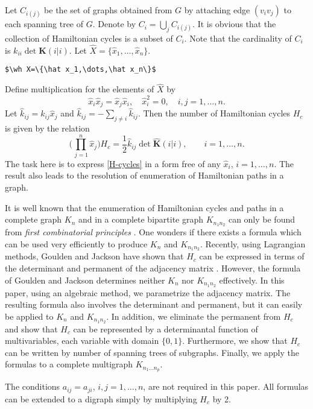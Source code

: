 \documentclass{article}
\theoremstyle{definition}
\theoremstyle{remark}
\newcommand{\wh}{\widehat}
\begin{document}
Let $C_{i(j)}$ be the set of graphs obtained from $G$ by attaching edge
$(v_iv_j)$ to each spanning tree of $G$. Denote by $C_i=\bigcup_j
C_{i(j)}$. It is obvious that the collection of Hamiltonian cycles is a
subset of $C_i$. Note that the cardinality of $C_i$ is $k_{ii}\det
\mathbf{K}(i|i)$. Let $\wh X=\{\hat x_1,\dots,\hat x_n\}$.
\begin{verbatim}
$\wh X=\{\hat x_1,\dots,\hat x_n\}$
\end{verbatim}
Define multiplication for the elements of $\wh X$ by
\begin{equation}\label{multdef}
\hat x_i\hat x_j=\hat x_j\hat x_i,\quad \hat x^2_i=0,\quad
i,j=1,\dots,n.
\end{equation}
Let $\hat k_{ij}=k_{ij}\hat x_j$ and $\hat k_{ij}=-\sum_{j\not=i} \hat
k_{ij}$. Then the number of Hamiltonian cycles $H_c$ is given by the
relation \cite{liuchow:formalsum}
\begin{equation}\label{H-cycles}
\biggl(\prod^n_{\,j=1}\hat x_j\biggr)H_c=\frac{1}{2}\hat k_{ij}\det
\wh{\mathbf{K}}(i|i),\qquad i=1,\dots,n.
\end{equation}
The task here is to express \eqref{H-cycles}
in a form free of any $\hat x_i$,
$i=1,\dots,n$. The result also leads to the resolution of enumeration of
Hamiltonian paths in a graph.

It is well known that the enumeration of Hamiltonian cycles and paths in
a complete graph $K_n$ and in a complete bipartite graph $K_{n_1n_2}$
can only be found from \textit{first combinatorial principles}
\cite{hapa:graphenum}. One wonders if there exists a formula which can
be used very efficiently to produce $K_n$ and $K_{n_1n_2}$. Recently,
using Lagrangian methods, Goulden and Jackson have shown that $H_c$ can
be expressed in terms of the determinant and permanent of the adjacency
matrix \cite{gouja:lagrmeth}. However, the formula of Goulden and
Jackson determines neither $K_n$ nor $K_{n_1n_2}$ effectively. In this
paper, using an algebraic method, we parametrize the adjacency matrix.
The resulting formula also involves the determinant and permanent, but
it can easily be applied to $K_n$ and $K_{n_1n_2}$. In addition, we
eliminate the permanent from $H_c$ and show that $H_c$ can be
represented by a determinantal function of multivariables, each variable
with domain $\{0,1\}$. Furthermore, we show that $H_c$ can be written by
number of spanning trees of subgraphs. Finally, we apply the formulas to
a complete multigraph $K_{n_1\dots n_p}$.

The conditions $a_{ij}=a_{ji}$, $i,j=1,\dots,n$, are not required in
this paper. All formulas can be extended to a digraph simply by
multiplying $H_c$ by 2.
\end{document}
